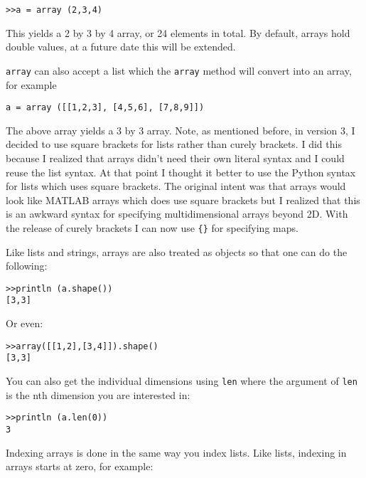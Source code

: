 \begin{lstlisting}
>>a = array (2,3,4)
\end{lstlisting}

This yields a 2 by 3 by 4 array, or 24 elements in total. By default, arrays hold double values, at a future date this will be extended.

{\tt array} can also accept a list which the {\tt array} method will convert into an array, for example

\begin{lstlisting}
a = array ([[1,2,3], [4,5,6], [7,8,9]])
\end{lstlisting}

The above array yields a 3 by 3 array. Note, as mentioned before, in version 3, I decided to use square brackets for lists rather than curely brackets. I did this because I realized that arrays didn't need their own literal syntax and I could reuse the list syntax. At that point I thought it better to use the Python syntax for lists which uses square brackets. The original intent was that arrays would look like MATLAB arrays which does use square brackets but I realized that this is an awkward syntax for specifying multidimensional arrays beyond 2D. With the release of curely brackets I can now use {\tt \verb|{|\verb|}|} for specifying maps.

Like lists and strings, arrays are also treated as objects so that one can do the following:

\begin{lstlisting}
>>println (a.shape())
[3,3]
\end{lstlisting}

Or even:

\begin{lstlisting}
>>array([[1,2],[3,4]]).shape()
[3,3]
\end{lstlisting}

You can also get the individual dimensions using {\tt len} where the argument of {\tt len} is the nth dimension you are interested in:

\begin{lstlisting}
>>println (a.len(0))
3
\end{lstlisting}


Indexing arrays is done in the same way you index lists. Like lists, indexing in arrays starts at zero, for example:

